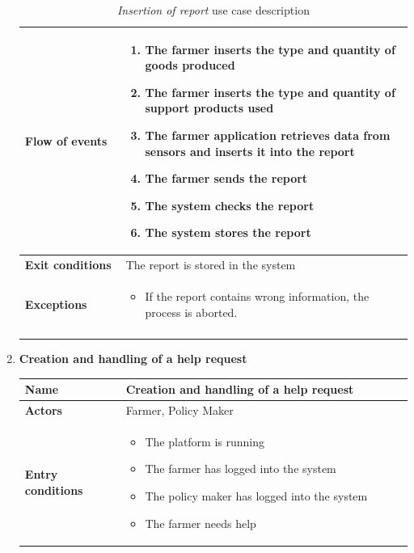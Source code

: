 \documentclass[10pt]{article}
\begin{document}
\begin{enumerate}[label=\textbf{UC\arabic*}]
\begin{longtable}{p{0.26\linewidth}p{0.75\linewidth}}
            \midrule
            \textbf{Flow of events} & 
            \begin{enumerate}
                \item The farmer inserts the type and quantity of goods produced
                \item The farmer inserts the type and quantity of support products used
                \item The farmer application retrieves data from sensors and inserts it into the report
                \item The farmer sends the report
                \item The system checks the report
                \item The system stores the report
            \end{enumerate} \\
            \midrule
            \textbf{Exit conditions} & The report is stored in the system\\
            \midrule
            \textbf{Exceptions} & 
            \begin{itemize}
                \item If the report contains wrong information, the process is aborted.
            \end{itemize} \\
            \bottomrule
            \caption{\emph{Insertion of report} use case description}
        \end{longtable}
    \newpage
    \item \label{uc:uc5} \textbf{Creation and handling of a help request}
        \begin{longtable}{p{0.26\linewidth}p{0.75\linewidth}}
            \toprule
            \textbf{Name} & \textbf{Creation and handling of a help request} \\
            \midrule
            \textbf{Actors} & Farmer, Policy Maker\\
            \midrule
            \textbf{Entry conditions} & 
            \begin{itemize}
                \item The platform is running
                \item The farmer has logged into the system
                \item The policy maker has logged into the system
                \item The farmer needs help
            \end{itemize}\\

\end{longtable}
\end{enumerate}
\end{document}
